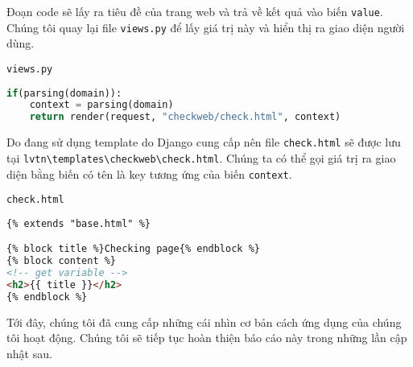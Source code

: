 \par
Đoạn code sẽ lấy ra tiêu đề của trang web và trả về kết quả vào biến \texttt{value}. Chúng tôi quay lại file \texttt{views.py} để lấy giá trị này và hiển thị ra giao diện người dùng.
\\\par
\texttt{views.py}
\begin{lstlisting}[language=Python]
if(parsing(domain)):
	context = parsing(domain)
	return render(request, "checkweb/check.html", context)
\end{lstlisting}
\par
Do đang sử dụng template do Django cung cấp nên file \texttt{check.html} sẽ được lưu tại \texttt{lvtn\textbackslash templates\textbackslash checkweb\textbackslash check.html}. Chúng ta có thể gọi giá trị ra giao diện bằng biến có tên là key tương ứng của biến \texttt{context}.
\\\par
\texttt{check.html}
\begin{lstlisting}[language=HTML]
{% extends "base.html" %}

{% block title %}Checking page{% endblock %}
{% block content %}
<!-- get variable -->
<h2>{{ title }}</h2>
{% endblock %}
\end{lstlisting}
\par
Tới đây, chúng tôi đã cung cấp những cái nhìn cơ bản cách ứng dụng của chúng tôi hoạt động. Chúng tôi sẽ tiếp tục hoàn thiện báo cáo này trong những lần cập nhật sau.